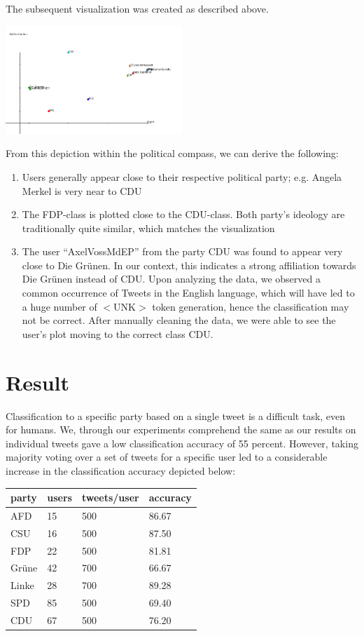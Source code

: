 \documentclass[10pt, oneside]{article}
\begin{document}
\begin{multicols}{2}
The subsequent visualization was created as described above.

\includegraphics[width=0.5\textwidth]{images/Political_Compass.png}

From this depiction within the political compass, we can derive the following:

\begin{enumerate}
	\item Users generally appear close to their respective political party; e.g. Angela Merkel is very near to CDU
	\item The FDP-class is plotted close to the CDU-class. Both party's ideology are traditionally quite similar, which matches the visualization
	\item The user ``AxelVossMdEP'' from the party CDU was found to appear very close to Die Grünen. In our context, this indicates a strong affiliation towards Die Grünen instead of CDU. Upon analyzing the data, we observed a common occurrence  of Tweets in the English language, which will have led to a huge number of $<$UNK$>$ token generation, hence the classification may not be correct. After manually cleaning the data, we were able to see the user's plot moving to the correct class CDU.
\end{enumerate}

\section{Result}
Classification to a specific party based on a single tweet is a difficult task, even for humans. We, through our experiments comprehend the same as our results on individual tweets gave a low classification accuracy of 55 percent.
However, taking majority voting over a set of tweets for a specific user led to a considerable increase in the classification accuracy depicted below:
\begin{center}
	\begin{tabular}{|l|l|l|l|}
	\hline
	\textbf{party} & \textbf{users} & \textbf{tweets/user} & \textbf{accuracy} \\ \hline
	AFD & 15 & 500 & 86.67 \\
	CSU & 16 & 500 & 87.50 \\
	FDP & 22 & 500 & 81.81 \\
	Grüne & 42 & 700 & 66.67 \\
	Linke & 28 & 700 & 89.28 \\
	SPD & 85 & 500 & 69.40 \\
	CDU & 67 & 500 & 76.20 \\
	\hline
	\end{tabular}
\end{center}



\end{multicols}
\end{document}
